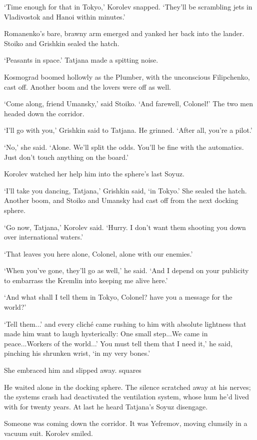 `Time enough for that in Tokyo,' Korolev snapped. `They'll be scrambling jets in Vladivostok and Hanoi within minutes.'

Romanenko's bare, brawny arm emerged and yanked her back into the lander. Stoiko and Grishkin sealed the hatch.

`Peasants in space.' Tatjana made a spitting noise.

Kosmograd boomed hollowly as the Plumber, with the unconscious Filipchenko, cast off. Another boom and the lovers were off as well.

`Come along, friend Umansky,' said Stoiko. `And farewell, Colonel!' The two men headed down the corridor.

`I'll go with you,' Grishkin said to Tatjana. He grinned. `After all, you're a pilot.'

`No,' she said. `Alone. We'll split the odds. You'll be fine with the automatics. Just don't touch anything on the board.'

Korolev watched her help him into the sphere's last Soyuz.

`I'll take you dancing, Tatjana,' Grishkin said, `in Tokyo.' She sealed the hatch. Another boom, and Stoiko and Umansky had cast off from the next docking sphere.

`Go now, Tatjana,' Korolev said. `Hurry. I don't want them shooting you down over international waters.'

`That leaves you here alone, Colonel, alone with our enemies.'

`When you've gone, they'll go as well,' he said. `And I depend on your publicity to embarrass the Kremlin into keeping me alive here.'

`And what shall I tell them in Tokyo, Colonel? have you a message for the world?'

`Tell them...' and every cliché came rushing to him with absolute lightness that made him want to laugh hysterically: One small step...We came in peace...Workers of the world...' You must tell them that I need it,' he said, pinching his shrunken wrist, `in my very bones.'

She embraced him and slipped away.
squares

He waited alone in the docking sphere. The silence scratched away at his nerves; the systems crash had deactivated the ventilation system, whose hum he'd lived with for twenty years. At last he heard Tatjana's Soyuz disengage.

Someone was coming down the corridor. It was Yefremov, moving clumsily in a vacuum suit. Korolev smiled.

